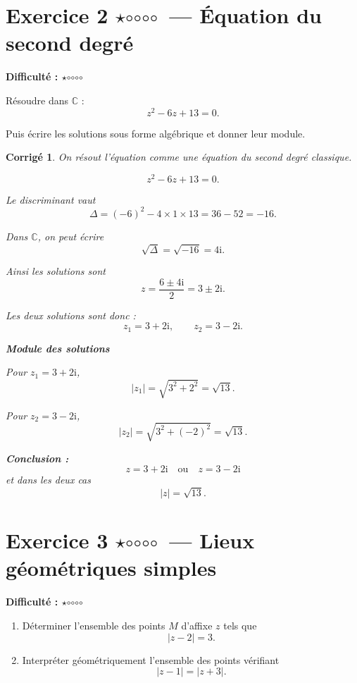 \documentclass[11pt,a4paper]{article}
\newtheorem*{corrige}{Corrigé}
\newcommand{\C}{\mathbb{C}}
\newcommand{\ii}{\mathrm{i}}
\newcommand{\fullstar}{\(\star\)}
\newcommand{\emptystar}{\(\circ\)}
\newcommand{\oneStar}{\fullstar\emptystar\emptystar\emptystar\emptystar}
\newcommand{\difficulty}[1]{\textbf{Difficulté : #1}}
\begin{document}
\section{Exercice 2 \oneStar\ --- Équation du second degré}
\difficulty{\oneStar}

Résoudre dans \(\C\) :
\[
z^2-6z+13=0.
\]

Puis écrire les solutions sous forme algébrique et donner leur module.

\begin{corrige}
On résout l'équation comme une équation du second degré classique.

\[
z^2-6z+13=0.
\]

Le discriminant vaut
\[
\Delta=(-6)^2-4\times 1\times 13=36-52=-16.
\]

Dans \(\C\), on peut écrire
\[
\sqrt{\Delta}=\sqrt{-16}=4\ii.
\]

Ainsi les solutions sont
\[
z=\frac{6\pm 4\ii}{2}=3\pm 2\ii.
\]

Les deux solutions sont donc :
\[
z_1=3+2\ii,\qquad z_2=3-2\ii.
\]

\textbf{Module des solutions}

Pour \(z_1=3+2\ii\),
\[
|z_1|=\sqrt{3^2+2^2}=\sqrt{13}.
\]

Pour \(z_2=3-2\ii\),
\[
|z_2|=\sqrt{3^2+(-2)^2}=\sqrt{13}.
\]

\textbf{Conclusion :}
\[
\boxed{z=3+2\ii \quad \text{ou} \quad z=3-2\ii}
\]
et dans les deux cas
\[
|z|=\sqrt{13}.
\]
\end{corrige}

\section{Exercice 3 \oneStar\ --- Lieux géométriques simples}
\difficulty{\oneStar}

\begin{enumerate}
    \item Déterminer l'ensemble des points \(M\) d'affixe \(z\) tels que
    \[
    |z-2|=3.
    \]
    \item Interpréter géométriquement l'ensemble des points vérifiant
    \[
    |z-1|=|z+3|.
    \]
\end{enumerate}
\end{document}
